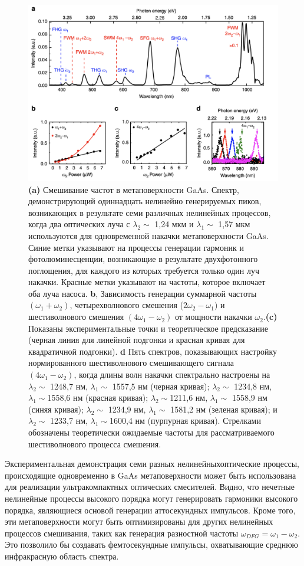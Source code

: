 \begin{figure}[h!]
	\centering
	\includegraphics[width=0.8\linewidth]{images/mixer1.png}
	\caption{\textbf{(a)} Смешивание частот в метаповерхности GaAs. Спектр, демонстрирующий одиннадцать нелинейно генерируемых пиков, возникающих в результате семи различных нелинейных процессов, когда два оптических луча с  $\lambda_2 \sim$ 1,24 мкм и  $\lambda_1 \sim$ 1,57 мкм используются для одновременной накачки метаповерхности GaAs. Синие метки указывают на процессы генерации гармоник и фотолюминесценции, возникающие в результате двухфотонного поглощения, для каждого из которых требуется только один луч накачки. Красные метки указывают на частоты, которое включает оба луча насоса. \textbf{b}, Зависимость генерации суммарной частоты $(\omega_1 + \omega_2)$, четырехволнового смешения ($2\omega_2 - \omega_1)$ и шестиволнового смешения $(4\omega_1 - \omega_2)$ от мощности накачки $\omega_2$.\textbf{(c) } Показаны экспериментальные  точки и теоретическое предсказание (черная линия для линейной подгонки и красная кривая для квадратичной подгонки). \textbf{d} Пять спектров, показывающих настройку нормированного шестиволнового смешивающего сигнала $(4\omega_1 - \omega_2)$, когда длины волн накачки спектрально настроены на $\lambda_2 \sim$ 1248,7 нм,  $\lambda_1 \sim$ 1557,5 нм (черная кривая); $\lambda_2 \sim$ 1234,8 нм, $\lambda_1 \sim$1558,6 нм (красная кривая); $\lambda_2 \sim$1211,6 нм, $\lambda_1 \sim$ 1558,9 нм (синяя кривая); $\lambda_2 \sim$ 1234,9 нм, $\lambda_1 \sim$ 1581,2 нм (зеленая кривая); и $\lambda_2 \sim$ 1233,7 нм, $\lambda_1 \sim$1600,4 нм (пурпурная кривая). Стрелками обозначены теоретически ожидаемые частоты для рассматриваемого шестиволнового процесса смешения. \cite{liu2018all}}
	\label{mixerPictr2}
\end{figure}
\hspace*{2mm}
Экспериментальная демонстрация семи разных нелинейныхоптические процессы, происходящие одновременно в GaAs метаповерхности может быть использована для реализации ультракомпактных оптических смесителей. Видно, что нечетные нелинейные процессы высокого порядка могут генерировать гармоники высокого порядка, являющиеся основой генерации аттосекундных импульсов. Кроме того, эти метаповерхности могут быть оптимизированы для других нелинейных процессов смешивания, таких как генерация разностной частоты $\omega_{DFG} = \omega_1 - \omega_2$. Это позволило бы создавать фемтосекундные импульсы, охватывающие среднюю инфракрасную область спектра. 